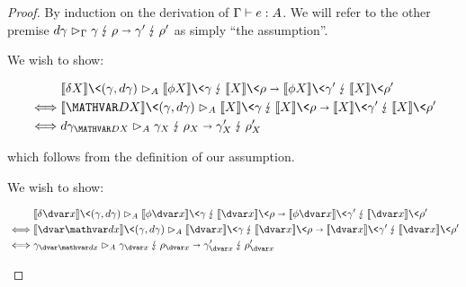 \SeminaiveFundamental*
\begin{proof}
  \label{proof-seminaive-fundamental}
  By induction on the derivation of ${\Gamma} \vdash {e} \mathrel{:} {A}$.
  We will refer to the other premise ${d\gamma} \mathrel{\rhd}_{\Gamma} \gamma \mathbin{\lightning} \rho \shortrightarrow \gamma' \mathbin{\lightning} \rho'$ as simply ``the assumption''.

  \begin{description}[topsep=\baselineskip,itemsep=\baselineskip]

  \item[Case $\infer{\hm x A \in \G}{\J{\mvar x}\G A}$.]
    We wish to show:

    \begin{align*}
      &\weirdat A
               {\den{\delta \mvar x}\<(\gamma,\dgamma)}
               {\den{\phi \mvar x}\<\gamma}
               {\den{\mvar x}\<\rho}
               {\den{\phi \mvar x}\<\gamma'}
               {\den{\mvar x}\<\rho'}
      \\
      \iff&
      \weirdat A
               {\den{\mvar\dx}\<(\gamma,\dgamma)}
               {\den{\mvar x}\<\gamma}
               {\den{\mvar x}\<\rho}
               {\den{\mvar x}\<\gamma'}
               {\den{\mvar x}\<\rho'}
      \\
      \iff&
      \weirdat A
               {\dgamma_{\mvar\dx}}
               {\gamma_{\mvar x}}
               {\rho_{\mvar x}}
               {\gamma'_{\mvar x}}
               {\rho'_{\mvar x}}
    \end{align*}

    \noindent
    which follows from the definition of our assumption.

  \item[Case $\infer{\hd x A \in \G}{\J{\dvar x}\G A}$.]
    We wish to show:

    \begin{align*}
      &\weirdat A
               {\den{\delta \dvar x}\<(\gamma,\dgamma)}
               {\den{\phi \dvar x}\<\gamma}
               {\den{\dvar x}\<\rho}
               {\den{\phi \dvar x}\<\gamma'}
               {\den{\dvar x}\<\rho'}
      \\
      \iff&
      \weirdat A
               {\den{\dvar\dx}\<(\gamma,\dgamma)}
               {\den{\dvar x}\<\gamma}
               {\den{\dvar x}\<\rho}
               {\den{\dvar x}\<\gamma'}
               {\den{\dvar x}\<\rho'}
      \\
      \iff&
      \weirdat A
               {\gamma_{\dvar\dx}}
               {\gamma_{\dvar x}}
               {\rho_{\dvar x}}
               {\gamma'_{\dvar x}}
               {\rho'_{\dvar x}}
    \end{align*}


\end{description}
\end{proof}
